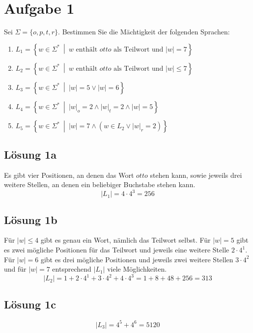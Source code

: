 \documentclass[main.tex]{subfiles}
\begin{document}
\section{Aufgabe 1}

Sei $\Sigma = \{o, p, t, r\}$. Bestimmen Sie die Mächtigkeit der folgenden Sprachen:

\begin{enumerate}
    \item $L_1 = \left\{ w\in \Sigma^*\ \middle|\ w \text{ enthält } otto \text{ als Teilwort und } |w| = 7 \right\}$
    \item $L_2 = \left\{ w\in \Sigma^*\ \middle|\ w \text{ enthält } otto \text{ als Teilwort und } |w|\leq 7 \right\}$
    \item $L_3 = \left\{ w\in \Sigma^*\ \middle|\ |w|=5 \lor |w|=6 \right\}$
    \item $L_4 = \left\{ w\in \Sigma^*\ \middle|\ |w|_o = 2 \land |w|_t = 2 \land |w| = 5 \right\}$
    \item $L_5 = \left\{ w\in \Sigma^*\ \middle|\ |w| = 7 \land \left( w\in L_2 \lor |w|_r = 2\right) \right\}$
\end{enumerate}


\subsection{Lösung 1a}
Es gibt vier Positionen, an denen das Wort $otto$ stehen kann, sowie jeweils drei weitere Stellen, an denen ein beliebiger Buchstabe stehen kann.
$$
    |L_1| = 4\cdot 4^3 = 256
$$

\subsection{Lösung 1b}
Für $|w|\leq 4$ gibt es genau ein Wort, nämlich das Teilwort selbst.
Für $|w|=5$ gibt es zwei mögliche Positionen für das Teilwort und jeweils eine weitere Stelle $2\cdot 4^1$.
Für $|w|=6$ gibt es drei mögliche Positionen und jeweils zwei weitere Stellen $3\cdot 4^2$ und für $|w|=7$ entsprechend $|L_1|$ viele Möglichkeiten.
$$
    |L_2| = 1 + 2\cdot 4^1 + 3\cdot 4^2 + 4\cdot 4^3 = 1 + 8 + 48 +  256 = 313
$$

\subsection{Lösung 1c}
$$
    |L_3| = 4^5 + 4^6 = 5120
$$
\end{document}
